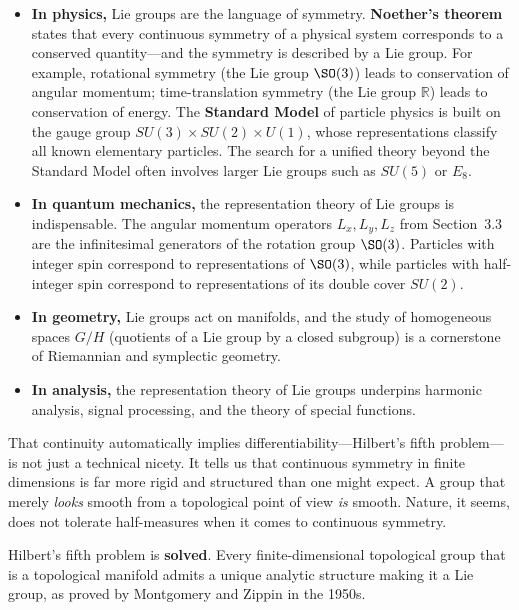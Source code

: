 \begin{itemize}
    \item \textbf{In physics,} Lie groups are the language of symmetry. \textbf{Noether's theorem} states that every continuous symmetry of a physical system corresponds to a conserved quantity---and the symmetry is described by a Lie group. For example, rotational symmetry (the Lie group $\SO(3)$) leads to conservation of angular momentum; time-translation symmetry (the Lie group $\mathbb{R}$) leads to conservation of energy. The \textbf{Standard Model} of particle physics is built on the gauge group $SU(3) \times SU(2) \times U(1)$, whose representations classify all known elementary particles. The search for a unified theory beyond the Standard Model often involves larger Lie groups such as $SU(5)$ or $E_8$.

    \item \textbf{In quantum mechanics,} the representation theory of Lie groups is indispensable. The angular momentum operators $L_x, L_y, L_z$ from Section~3.3 are the infinitesimal generators of the rotation group $\SO(3)$. Particles with integer spin correspond to representations of $\SO(3)$, while particles with half-integer spin correspond to representations of its double cover $SU(2)$.

    \item \textbf{In geometry,} Lie groups act on manifolds, and the study of homogeneous spaces $G/H$ (quotients of a Lie group by a closed subgroup) is a cornerstone of Riemannian and symplectic geometry.

    \item \textbf{In analysis,} the representation theory of Lie groups underpins harmonic analysis, signal processing, and the theory of special functions.
\end{itemize}

That continuity automatically implies differentiability---Hilbert's fifth problem---is not just a technical nicety. It tells us that continuous symmetry in finite dimensions is far more rigid and structured than one might expect. A group that merely \emph{looks} smooth from a topological point of view \emph{is} smooth. Nature, it seems, does not tolerate half-measures when it comes to continuous symmetry.

\begin{solvedbox}
Hilbert's fifth problem is \textbf{solved}. Every finite-dimensional topological group that is a topological manifold admits a unique analytic structure making it a Lie group, as proved by Montgomery and Zippin in the 1950s.
\end{solvedbox}

